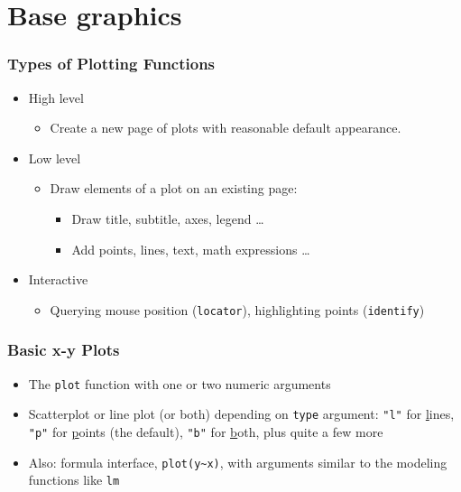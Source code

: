 \documentclass[xcolor=svgnames]{beamer}
\newcommand{\code}[1]{\texttt{#1}}
\begin{document}
\section{Base graphics}

\begin{frame}
  \frametitle{Types of Plotting Functions}
  \begin{itemize}
  \item High level
    \begin{itemize}
      \item Create a new page of plots with reasonable default appearance.
    \end{itemize}
  \item Low level
    \begin{itemize}
      \item Draw elements of a plot on an existing page:
        \begin{itemize}
        \item Draw title, subtitle, axes, legend \dots
        \item Add points, lines, text, math expressions \dots
        \end{itemize}
    \end{itemize}
  \item Interactive
    \begin{itemize}
    \item Querying mouse position (\code{locator}), highlighting
      points (\code{identify})
    \end{itemize}
  \end{itemize}
\end{frame}

\begin{frame}
  \frametitle{Basic x-y Plots}
  \begin{itemize}
  \item The \code{plot} function with one or two numeric arguments
  \item Scatterplot or line plot (or both) depending on \code{type}
    argument: \code{"l"} for \underline{l}ines, \code{"p"} for
    \underline{p}oints (the default), \code{"b"} for \underline{b}oth, plus
    quite a few more
  \item Also: formula interface, \code{plot(y\textasciitilde x)}, with
    arguments similar to the modeling functions like \code{lm}
  \end{itemize}
\end{frame}
\end{document}
